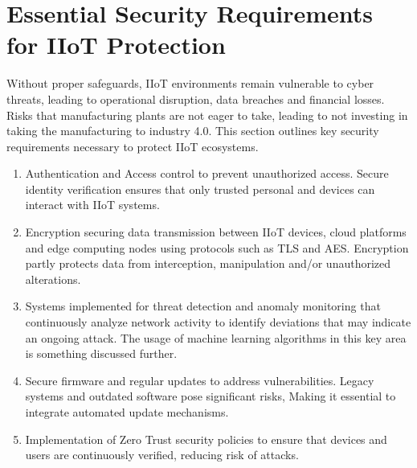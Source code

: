\documentclass[article,a4paper]{IEEEtran}
\begin{document}
\section{Essential Security Requirements for IIoT Protection}
Without proper safeguards, IIoT environments remain vulnerable to cyber threats, leading to operational disruption, data breaches and financial losses. Risks that manufacturing plants are not eager to take, leading to not investing in taking the manufacturing to industry 4.0. This section outlines key security requirements necessary to protect IIoT ecosystems.
\newline 
\begin{enumerate}
    \item Authentication and Access control to prevent unauthorized access. Secure identity verification ensures that only trusted personal and devices can interact with IIoT systems. 
    \item Encryption securing data transmission between IIoT devices, cloud platforms and edge computing nodes using protocols such as TLS and AES. Encryption partly protects data from interception, manipulation and/or unauthorized alterations. 
    \item Systems implemented for threat detection and anomaly monitoring that continuously analyze network activity to identify deviations that may indicate an ongoing attack. The usage of machine learning algorithms in this key area is something discussed further.  
    \item Secure firmware and regular updates to address vulnerabilities. Legacy systems and outdated software pose significant risks, Making it essential to integrate automated update mechanisms. 
    \item Implementation of Zero Trust security policies to ensure that devices and users are continuously verified, reducing risk of attacks. 
\end{enumerate}
\end{document}
